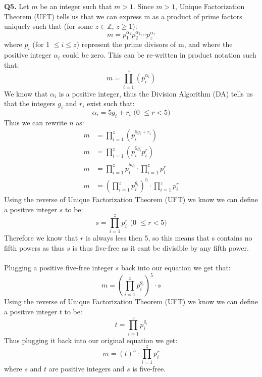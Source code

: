 \documentclass[11pt]{article}
\begin{document}
\parindent=0pt

\textbf{Q5.} Let $m$ be an integer such that $m > 1$. Since $m >1$, Unique Factorization Theorem (UFT) tells us that we can express m as a product of prime factors uniquely such that (for some $z \in \mathbb{Z}$, $z \geq 1$):
\[ m = p_1^{\alpha_1}p_2^{\alpha_2}\cdots p_z^{\alpha_z}  \]
where $p_i$ (for 1 $\leq i \leq z$) represent the prime divisors of m, and where the positive integer $\alpha_i$ could be zero. This can be re-written in product notation such that:
\[ m  = \prod_{i=1}^z(p_i^{\alpha_i}) \]
We know that $\alpha_i$ is a positive integer, thus the Division Algorithm (DA) tells us that the integers $g_i$ and $r_i$ exist such that:
\[ \alpha_i = 5g_i + r_i \text { (0 $\leq r < 5$)}\]
Thus we can rewrite $n$ as:
\begin{align*}
m  &= \prod_{i=1}^z(p_i^{5g_i + r_i}) \\
m  &= \prod_{i=1}^z(p_i^{5g_i}p^r_i)\\
m  &= \prod_{i=1}^zp_i^{5g_i} \cdot \prod_{i=1}^zp^r_i\\
m  &= (\prod_{i=1}^zp_i^{g_i})^5 \cdot \prod_{i=1}^zp^r_i
\end{align*}
Using the reverse of Unique Factorization Theorem (UFT) we know we can define a positive integer $s$ to be:
\[ s = \prod_{i=1}^zp^r_i  \text { (0 $\leq r < 5$)}\]
Therefore we know that $r$ is always less then 5, so this means that s contains no fifth powers as thus $s$ is thus five-free as it cant be divisible by any fifth power.\\\\
Plugging a positive five-free integer $s$ back into our equation we get that:
\[ m  = (\prod_{i=1}^zp_i^{g_i})^5 \cdot s\]
Using the reverse of Unique Factorization Theorem (UFT) we know we can define a positive integer $t$ to be:
\[ t = \prod_{i=1}^zp_i^{q_i}  \]
Thus plugging it back into our original equation we get:
\[ m  = (t)^5 \cdot \prod_{i=1}^zp^r_i \]
where $s$ and $t$ are positive integers and $s$ is five-free.
\end{document}
